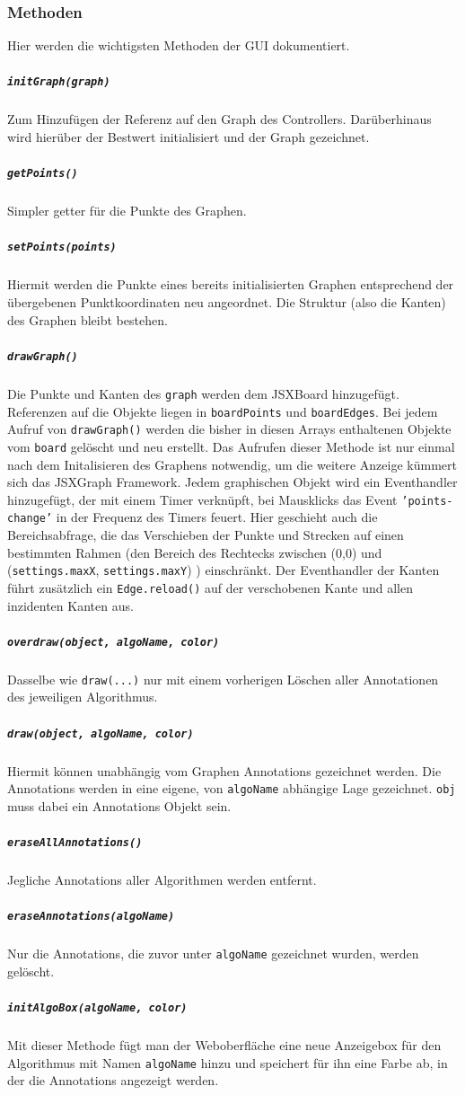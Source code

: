 \documentclass[a4paper,twocolumn]{scrartcl}
\begin{document}
\subsubsection{Methoden}
Hier werden die wichtigsten Methoden der GUI dokumentiert.
    \subparagraph{\texttt{initGraph(graph)}} 
    Zum Hinzufügen der Referenz auf den Graph des Controllers. Darüberhinaus wird hierüber der Bestwert initialisiert und der Graph gezeichnet.
    \subparagraph{\texttt{getPoints()}} 
    Simpler getter für die Punkte des Graphen.
    \subparagraph{\texttt{setPoints(points)}} 
    Hiermit werden die Punkte eines bereits initialisierten Graphen entsprechend der übergebenen Punktkoordinaten neu angeordnet. Die Struktur (also die Kanten) des Graphen bleibt bestehen.
    \subparagraph{\texttt{drawGraph()}} 
    Die Punkte und Kanten des \texttt{graph} werden dem JSXBoard hinzugefügt. Referenzen auf die Objekte liegen in \texttt{boardPoints} und \texttt{boardEdges}. Bei jedem Aufruf von \texttt{drawGraph()} werden die bisher in diesen Arrays enthaltenen Objekte vom \texttt{board} gelöscht und neu erstellt. Das Aufrufen dieser Methode ist nur einmal nach dem Initalisieren des Graphens notwendig, um die weitere Anzeige kümmert sich das JSXGraph Framework. Jedem graphischen Objekt wird ein Eventhandler hinzugefügt, der mit einem Timer verknüpft, bei Mausklicks das Event \texttt{'points-change'} in der Frequenz des Timers feuert. Hier geschieht auch die Bereichsabfrage, die das Verschieben der Punkte und Strecken auf einen bestimmten Rahmen (den Bereich des Rechtecks zwischen (0,0) und (\texttt{settings.maxX}, \texttt{settings.maxY}) ) einschränkt.
    Der Eventhandler der Kanten führt zusätzlich ein \texttt{Edge.reload()} auf der verschobenen Kante und allen inzidenten Kanten aus.
    \subparagraph{\texttt{overdraw(object, algoName, color)}} 
    Dasselbe wie \texttt{draw(...)} nur mit einem vorherigen Löschen aller Annotationen des jeweiligen Algorithmus.
    \subparagraph{\texttt{draw(object, algoName, color)}} 
    Hiermit können unabhängig vom Graphen Annotations gezeichnet werden. Die Annotations werden in eine eigene, von \texttt{algoName} abhängige Lage gezeichnet. \texttt{obj} muss dabei ein Annotations Objekt sein.
    \subparagraph{\texttt{eraseAllAnnotations()}} 
    Jegliche Annotations aller Algorithmen werden entfernt.
    \subparagraph{\texttt{eraseAnnotations(algoName)}} 
    Nur die Annotations, die zuvor unter \texttt{algoName} gezeichnet wurden, werden gelöscht.
    \subparagraph{\texttt{initAlgoBox(algoName, color)}} 
    Mit dieser Methode fügt man der Weboberfläche eine neue Anzeigebox für den Algorithmus mit Namen \texttt{algoName} hinzu und speichert für ihn eine Farbe ab, in der die Annotations angezeigt werden.
\end{document}
